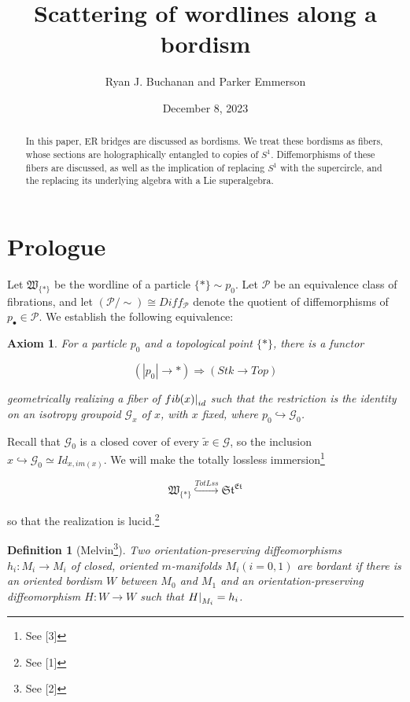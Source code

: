 \documentclass{article}
\title{Scattering of wordlines along a bordism}
\author{Ryan J. Buchanan and Parker Emmerson}
\date{December 8, 2023}
\newtheorem{dn}{Definition}
\newtheorem{ax}{Axiom}
\newcommand\restr[2]{{%
		\left.\kern-\nulldelimiterspace %
		#1 %
		\littletaller %
		\right|_{#2} %
}}
\newcommand{\littletaller}{\mathchoice{\vphantom{\big|}}{}{}{}}
\begin{document}
	\maketitle
	
	\begin{abstract}
		In this paper, ER bridges are discussed as bordisms. We treat these bordisms as fibers, whose sections are holographically entangled to copies of $S^1$. Diffemorphisms of these fibers are discussed, as well as the implication of replacing $S^1$ with the supercircle, and the replacing its underlying algebra with a Lie superalgebra.
	\end{abstract}
	
	\section{Prologue}
	Let $\mathfrak{W}_{\{\ast\}}$ be the wordline of a particle $\{\ast\} \sim p_0$. Let $\mathscr{P}$ be an equivalence class of fibrations, and let $(\mathscr{P}/\sim) \cong Diff_\mathscr{P}$ denote the quotient of diffemorphisms of $p_\bullet \in \mathscr{P}$. We establish the following equivalence:
	
	\begin{ax}
		For a particle $p_0$ and a topological point $\{\ast\}$, there is a functor
		
		$$(|p_0| \longrightarrow {\ast}) \Rightarrow (Stk \longrightarrow Top)$$
		
		geometrically realizing a fiber of $\restr{fib(x)}{id}$ such that the restriction is the identity on an isotropy groupoid $\mathscr{G}_x$ of $x$, with $x$ fixed, where $p_0 \hookrightarrow \mathscr{G}_0$.
	\end{ax}
	
	Recall that $\mathscr{G}_0$ is a closed cover of every $\tilde{x} \in \mathcal{G}$, so the inclusion $x \hookrightarrow \mathscr{G}_0 \simeq Id_{x,im(x)}$. We will make the totally lossless immersion\footnote{See [3]}
	
	$$\mathfrak{W}_{\{\ast\}} \overset{TotLss}{\hookrightarrow} \mathfrak{St^{Et}}$$
	
	so that the realization is lucid.\footnote{See [1]}
	
	\begin{dn}[Melvin\footnote{See [2]}]
		Two orientation-preserving diffeomorphisms $h_i: M_i \longrightarrow M_i$ of closed, oriented $m$-manifolds $M_i(i=0,1)$ are bordant if there is an oriented bordism $W$ between $M_0$ and $M_1$ and an orientation-preserving diffeomorphism $H:W \to W$ such that $\restr{H}{M_i} = h_i$.
	\end{dn}
	
\end{document}
